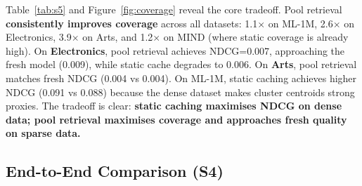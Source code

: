 \documentclass[sigconf,nonacm=false]{acmart}
\begin{document}
Table~\ref{tab:s5} and Figure~\ref{fig:coverage} reveal the core tradeoff. Pool retrieval \textbf{consistently improves coverage} across all datasets: 1.1$\times$ on ML-1M, 2.6$\times$ on Electronics, 3.9$\times$ on Arts, and 1.2$\times$ on MIND (where static coverage is already high). On \textbf{Electronics}, pool retrieval achieves NDCG=0.007, approaching the fresh model (0.009), while static cache degrades to 0.006. On \textbf{Arts}, pool retrieval matches fresh NDCG (0.004 vs 0.004). On ML-1M, static caching achieves higher NDCG (0.091 vs 0.088) because the dense dataset makes cluster centroids strong proxies. The tradeoff is clear: \textbf{static caching maximises NDCG on dense data; pool retrieval maximises coverage and approaches fresh quality on sparse data.}

\subsection{End-to-End Comparison (S4)}
\label{sec:exp_s4}
\end{document}
